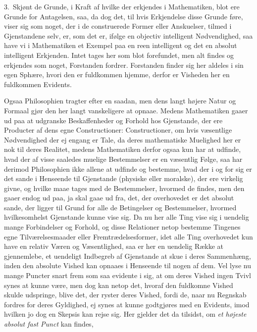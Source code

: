 \documentclass[12pt,a4paper]{book}
\newcommand{\apage}[1]{\marginnote{\footnotesize\textit{[#1]}}}
\begin{document}
3.~Skjønt de Grunde, i Kraft af hvilke der erkjendes i Mathematiken, blot ere%
 Grunde for Antagelsen, saa, da dog det, til hvis Erkjendelse disse Grunde føre,
viser sig som noget, der i de construerede Former eller Anskuelser, tilmed i
Gjenstandene selv, er, som det er, ifølge en objectiv intelligent Nødvendighed,
saa have vi i Mathematiken et Exempel paa en reen intelligent og det en absolut
intelligent Erkjenden. Intet tages her som blot forefundet, men alt findes og
erkjendes som noget, Forstanden fordrer. Forstanden finder sig her aldeles i sin
egen Sphære, hvori den er fuldkommen hjemme, derfor er Visheden her en fuldkommen
Evidents.

Ogsaa Philosophien tragter efter en saadan, men dens langt højere Natur og
Formaal gjør den her langt vanskeligere at opnaae. Medens Mathematiken gaaer ud
paa at udgranske Beskaffenheder og Forhold hos Gjenstande, der ere Producter af
dens egne Constructioner: Constructioner, om hvis væsentlige Nødvendighed der ej
engang er Tale, da deres mathematiske Muelighed her er \apage{86} nok til deres Realitet,
medens Mathematiken derfor ogsaa kun har at udfinde, hvad der af visse saaledes
muelige Bestemmelser er en væsentlig Følge, saa har derimod Philosophien ikke
allene at udfinde og bestemme, hvad der i og for sig er det sande i Henseende til
Gjenstande (physiske eller moralske), der ere virkelig givne, og hvilke maae
tages med de Bestemmelser, hvormed de findes, men den gaaer endog ud paa, ja skal
gaae ud fra, det, der overhovedet er det absolut sande, der ligger til Grund for
alle de Betingelser og Bestemmelser, hvormed hvilkesomhelst Gjenstande kunne vise
sig. Da nu her alle Ting vise sig i uendelig mange Forbindelser og Forhold, og
disse Relationer netop bestemme Tingenes egne Tilværelsesmaader eller
Fremtrædelsesformer, idet alle Ting overhovedet kun have en relativ Væren og
Væsentlighed, saa er her en uendelig Række at gjennemlebe, et uendeligt Indbegreb
af Gjenstande at skue i deres Sammenhæng, inden den absolute Vished kan opnaaes i
Henseende til nogen af dem. Vel lyse nu mange Puncter snart frem som saa evidente
i sig, at om deres Vished ingen Tvivl synes at kunne være, men dog kan netop det,
hvoraf den fuldkomne Vished skulde udspringe, blive det, der ryster deres Vished,
fordi de, naar nu Regnskab fordres for deres Gyldighed, ej synes at kunne
godtgjøres med en Evidents, imod hvilken jo dog en Skepsis kan rejse sig. Her
\apage{87} gjelder det da tilsidst, om \emph{et højeste absolut fast Punct} kan findes,
\end{document}
